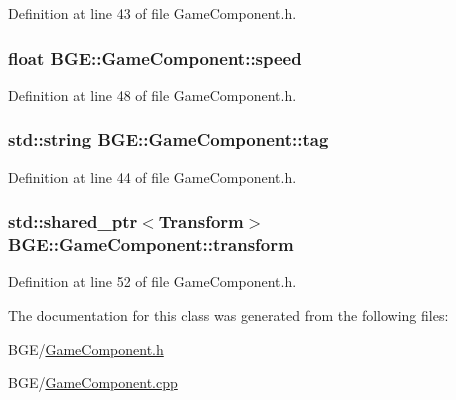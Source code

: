 Definition at line 43 of file Game\-Component.\-h.

\hypertarget{class_b_g_e_1_1_game_component_ab7b2e5aacc2e17f5ba824712d6603b5c}{
\subsubsection[{speed}]{\setlength{\rightskip}{0pt plus 5cm}float B\-G\-E\-::\-Game\-Component\-::speed}}\label{class_b_g_e_1_1_game_component_ab7b2e5aacc2e17f5ba824712d6603b5c}


Definition at line 48 of file Game\-Component.\-h.

\hypertarget{class_b_g_e_1_1_game_component_a7934229e91ebc58e91c6393860df70ee}{
\subsubsection[{tag}]{\setlength{\rightskip}{0pt plus 5cm}std\-::string B\-G\-E\-::\-Game\-Component\-::tag}}\label{class_b_g_e_1_1_game_component_a7934229e91ebc58e91c6393860df70ee}


Definition at line 44 of file Game\-Component.\-h.

\hypertarget{class_b_g_e_1_1_game_component_a085d32f2b004c05bca56f962b5bb7bd8}{
\subsubsection[{transform}]{\setlength{\rightskip}{0pt plus 5cm}std\-::shared\-\_\-ptr$<${\bf Transform}$>$ B\-G\-E\-::\-Game\-Component\-::transform}}\label{class_b_g_e_1_1_game_component_a085d32f2b004c05bca56f962b5bb7bd8}


Definition at line 52 of file Game\-Component.\-h.



The documentation for this class was generated from the following files\-:\begin{DoxyCompactItemize}
\item 
B\-G\-E/\hyperlink{_game_component_8h}{Game\-Component.\-h}\item 
B\-G\-E/\hyperlink{_game_component_8cpp}{Game\-Component.\-cpp}\end{DoxyCompactItemize}
